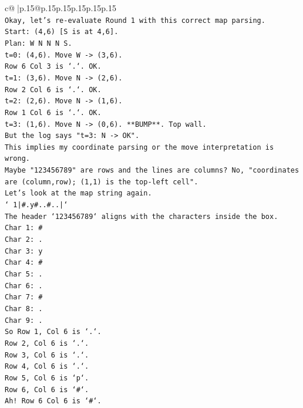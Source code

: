 \documentclass{article}
\begin{document}
{\begin{supertabular}{c@{$\;$}|p{.15\linewidth}@{}p{.15\linewidth}p{.15\linewidth}p{.15\linewidth}p{.15\linewidth}p{.15\linewidth}}
{{{\\ 
\texttt{Okay, let's re{-}evaluate Round 1 with this correct map parsing.} \\
\texttt{Start: (4,6) {[}S is at 4,6{]}.} \\
\texttt{Plan: W N N N S.} \\
\texttt{t=0: (4,6). Move W {-}> (3,6).} \\
\texttt{Row 6 Col 3 is `.`. OK.} \\
\texttt{t=1: (3,6). Move N {-}> (2,6).} \\
\texttt{Row 2 Col 6 is `.`. OK.} \\
\texttt{t=2: (2,6). Move N {-}> (1,6).} \\
\texttt{Row 1 Col 6 is `.`. OK.} \\
\texttt{t=3: (1,6). Move N {-}> (0,6). **BUMP**. Top wall.} \\
\texttt{But the log says "t=3: N {-}> OK".} \\
\texttt{This implies my coordinate parsing or the move interpretation is wrong.} \\
\texttt{Maybe "123456789" are rows and the lines are columns? No, "coordinates are (column,row); (1,1) is the top{-}left cell".} \\
\texttt{Let's look at the map string again.} \\
\texttt{` 1|\#.y\#..\#..|`} \\
\texttt{The header `123456789` aligns with the characters inside the box.} \\
\texttt{Char 1: \#} \\
\texttt{Char 2: .} \\
\texttt{Char 3: y} \\
\texttt{Char 4: \#} \\
\texttt{Char 5: .} \\
\texttt{Char 6: .} \\
\texttt{Char 7: \#} \\
\texttt{Char 8: .} \\
\texttt{Char 9: .} \\
\texttt{So Row 1, Col 6 is `.`.} \\
\texttt{Row 2, Col 6 is `.`.} \\
\texttt{Row 3, Col 6 is `.`.} \\
\texttt{Row 4, Col 6 is `.`.} \\
\texttt{Row 5, Col 6 is `p`.} \\
\texttt{Row 6, Col 6 is `\#`.} \\
\texttt{Ah! Row 6 Col 6 is `\#`.} \\
}}}
\end{supertabular}}
\end{document}
